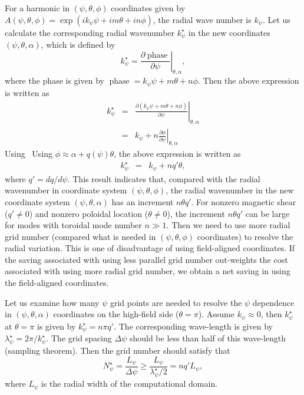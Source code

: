 \documentclass{llncs}
\newcommand{\tmop}[1]{\ensuremath{\operatorname{#1}}}
\begin{document}
For a harmonic in $(\psi, \theta, \phi)$ coordinates given by $A (\psi,
\theta, \phi) = \exp (i k_{\psi} \psi + i m \theta + i n \phi)$, the radial
wave number is $k_{\psi}$. Let us calculate the corresponding radial
wavenumber $k_{\psi}^{\star}$ in the new coordinates $(\psi, \theta, \alpha)$,
which is defined by
\begin{equation}
  k_{\psi}^{\star} \left. = \frac{\partial \tmop{phase}}{\partial \psi}
  \right|_{\theta, \alpha},
\end{equation}
where the phase is given by $\tmop{phase} = k_{\psi} \psi + m \theta + n
\phi$. Then the above expression is written as
\begin{eqnarray}
  k_{\psi}^{\star} & = & \left. \frac{\partial (k_{\psi} \psi + m \theta + n
  \phi)}{\partial \psi} \right|_{\theta, \alpha} \nonumber\\
  & = & k_{\psi} + n \left. \frac{\partial \phi}{\partial \psi}
  \right|_{\theta, \alpha} 
\end{eqnarray}
Using \ Using $\phi \approx \alpha + q (\psi) \theta$, the above expression is
written as
\begin{eqnarray}
  k_{\psi}^{\star} & = & k_{\psi} + n q' \theta, 
\end{eqnarray}
where $q' = d q / d \psi$. This result indicates that, compared with the
radial wavenumber in coordinate system $(\psi, \theta, \phi)$, the radial
wavenumber in the new coordinate system $(\psi, \theta, \alpha)$ has an
increment $n \theta q'$. For nonzero magnetic shear ($q' \neq 0$) and nonzero
poloidal location ($\theta \neq 0$), the increment $n \theta q'$ can be large
for modes with toroidal mode number $n \gg 1$. Then we need to use more radial
grid number (compared what is needed in $(\psi, \theta, \phi)$ coordinates) to
resolve the radial variation. This is one of disadvantage of using
field-aligned coordinates. If the saving associated with using less parallel
grid number out-weights the cost associated with using more radial grid
number, we obtain a net saving in using the field-aligned coordinates.

Let us examine how many $\psi$ grid points are needed to resolve the $\psi$
dependence in $(\psi, \theta, \alpha)$ coordinates on the high-field side
($\theta = \pi$). Assume $k_{\psi} \approx 0$, then $k_{\psi}^{\star}$ at
$\theta = \pi$ is given by $k_{\psi}^{\star} = n \pi q'$. The corresponding
wave-length is given by $\lambda_{\psi}^{\star} = 2 \pi / k_{\psi}^{\star}$.
The grid spacing $\Delta \psi$ should be less than half of this wave-length
(sampling theorem). Then the grid number should satisfy that
\begin{equation}
  N_{\psi}^{\star} = \frac{L_{\psi}}{\Delta \psi} \geqslant
  \frac{L_{\psi}}{\lambda_{\psi}^{\star} / 2} = n q' L_{\psi},
\end{equation}
where $L_{\psi}$ is the radial width of the computational domain.
\end{document}
